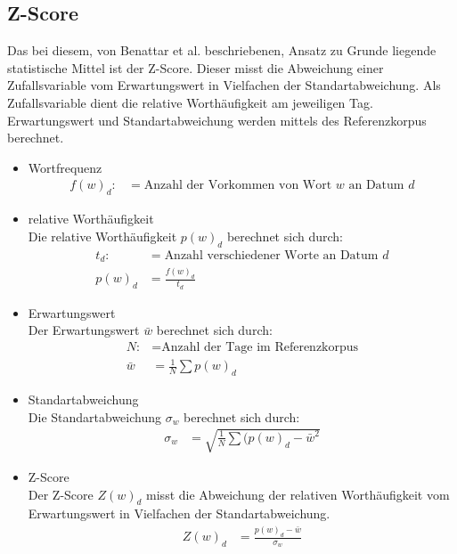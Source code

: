 \subsection{Z-Score}
Das bei diesem, von Benattar et al. \cite{benattar2011trend} beschriebenen, Ansatz zu Grunde liegende statistische Mittel ist der Z-Score. Dieser misst die Abweichung einer Zufallsvariable vom Erwartungswert in Vielfachen der Standartabweichung. Als Zufallsvariable dient die relative Worthäufigkeit am jeweiligen Tag. Erwartungswert und Standartabweichung werden mittels des Referenzkorpus berechnet. 

\begin{itemize}
	\item{Wortfrequenz}
		\begin{align*}
			f(w)_d :&= \text{Anzahl der Vorkommen von Wort $w$ an Datum $d$}
		\end{align*}
		
	\item{relative Worthäufigkeit}\\
		Die relative Worthäufigkeit $p(w)_d$ berechnet sich durch:
		\begin{align*}
			t_d   :&= \text{Anzahl verschiedener Worte an Datum $d$} \\
			p(w)_d &= \frac{f(w)_d}{t_d}
		\end{align*}						
		
	\item{Erwartungswert}\\
		Der Erwartungswert $\bar{w}$ berechnet sich durch:
		\begin{align*}
			N      :&= \text{Anzahl der Tage im Referenzkorpus} \\
			\bar{w} &= \frac{1}{N} \sum p(w)_d
		\end{align*}
		
	\item{Standartabweichung}\\
		Die Standartabweichung $\sigma_w$ berechnet sich durch:
		\begin{align*}
			\sigma_w &= \sqrt{\frac{1}{N} \sum (p(w)_d - \bar{w}^2}
		\end{align*}
		
	\item{Z-Score}\\
		Der Z-Score $Z(w)_d$ misst die Abweichung der relativen Worthäufigkeit vom Erwartungswert in Vielfachen der Standartabweichung.
		\begin{align*}
			Z(w)_d &= \frac{p(w)_d - \bar{w}}{\sigma_w}
		\end{align*}
		
\end{itemize}

